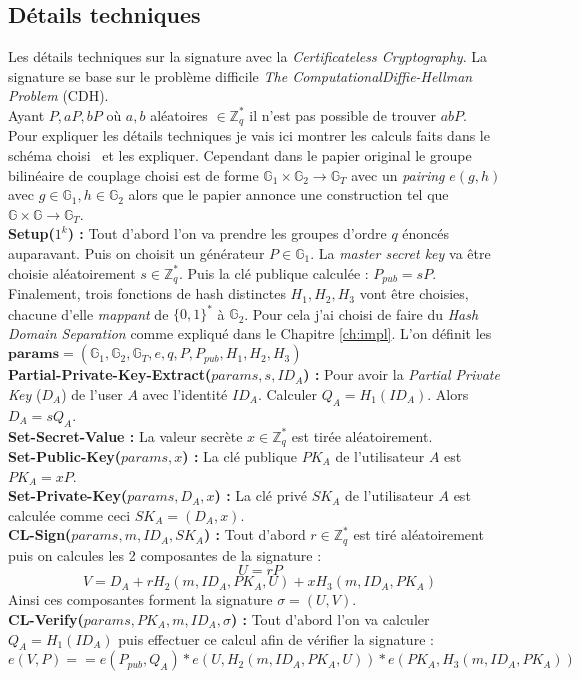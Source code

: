 \subsection{Détails techniques}
Les détails techniques sur la signature avec la \textit{Certificateless Cryptography}.
La signature se base sur le problème difficile \textit{The ComputationalDiffie-Hellman Problem} (CDH). \\Ayant $P, aP, bP$ où $a,b$ aléatoires $\in \mathbb{Z}_q^*$ il n'est pas possible de trouver $abP$.\\
Pour expliquer les détails techniques je vais ici montrer les calculs faits dans le schéma choisi~\cite{DBLP:conf/acns/ZhangWXF06} et les expliquer. Cependant dans le papier original le groupe bilinéaire de couplage choisi est de forme $\mathbb{G}_1 \times \mathbb{G}_2 \rightarrow \mathbb{G}_T$ avec un \textit{pairing} $e(g,h)$ avec $g \in \mathbb{G}_1, h \in \mathbb{G}_2$ alors que le papier annonce une construction tel que $\mathbb{G} \times \mathbb{G} \rightarrow \mathbb{G}_T$.\\
\textbf{Setup($1^k $) :} Tout d'abord l'on va prendre les groupes d'ordre $q$ énoncés auparavant. Puis on choisit un générateur $P \in \mathbb{G}_1$. La \textit{master secret key} va être choisie aléatoirement $s \in \mathbb{Z}_q^*$. Puis la clé publique calculée : $P_{pub} = sP$. Finalement, trois fonctions de hash distinctes $H_1, H_2, H_3$ vont être choisies, chacune d'elle \textit{mappant} de $\{0,1\}^*$ à $\mathbb{G}_2$. Pour cela j'ai choisi de faire du \textit{Hash Domain Separation} comme expliqué dans le Chapitre \ref{ch:impl}. L'on définit les $\mathbf{params} = (\mathbb{G}_1,\mathbb{G}_2,\mathbb{G}_T,e,q,P,P_{pub},H_1,H_2,H_3)$\\
\textbf{Partial-Private-Key-Extract($params, s, ID_A$) :} Pour avoir la \textit{Partial Private Key} ($D_A$) de l'user $A$ avec l'identité $ID_A$. Calculer $Q_A = H_1(ID_A)$. Alors $D_A = sQ_A$.\\
\textbf{Set-Secret-Value :} La valeur secrète $x \in \mathbb{Z}_q^*$ est tirée aléatoirement.\\
\textbf{Set-Public-Key($params, x$) :}  La clé publique $PK_A$ de l'utilisateur $A$ est $PK_A = xP$.\\
\textbf{Set-Private-Key($params, D_A, x$) :} La clé privé $SK_A$ de l'utilisateur $A$ est calculée comme ceci $SK_A = (D_A, x)$.\\
\textbf{CL-Sign($params, m, ID_A, SK_A$) :} Tout d'abord $r \in \mathbb{Z}_q^*$ est tiré aléatoirement puis on calcules les 2 composantes de la signature :
\[ U = rP\]
\[V = D_A + rH_2(m, ID_A, PK_A,U) + xH_3(m, ID_A, PK_A)\]
Ainsi ces composantes forment la signature $\sigma = (U,V )$.\\
\textbf{CL-Verify($params, PK_A,  m, ID_A, \sigma$) :} Tout d'abord l'on va calculer $Q_A = H_1(ID_A)$ puis effectuer ce calcul afin de vérifier la signature :
\[e(V,P) == e(P_{pub}, Q_A)*e(U, H_2(m, ID_A, PK_A,U))*e(PK_A, H_3(m, ID_A, PK_A)) \]
